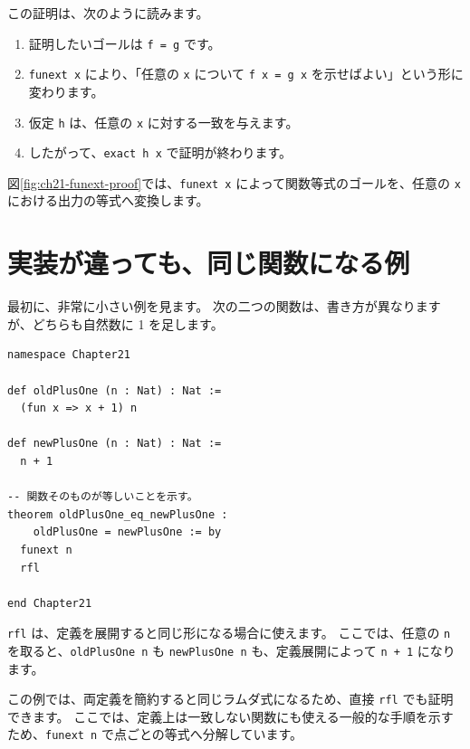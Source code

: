 この証明は、次のように読みます。

\begin{enumerate}
\item 証明したいゴールは \texttt{f = g} です。
\item \texttt{funext x} により、「任意の \texttt{x} について \texttt{f x = g x} を示せばよい」という形に変わります。
\item 仮定 \texttt{h} は、任意の \texttt{x} に対する一致を与えます。
\item したがって、\texttt{exact h x} で証明が終わります。
\end{enumerate}

図\ref{fig:ch21-funext-proof}では、\texttt{funext x} によって関数等式のゴールを、任意の \texttt{x} における出力の等式へ変換します。


\section{実装が違っても、同じ関数になる例}

最初に、非常に小さい例を見ます。
次の二つの関数は、書き方が異なりますが、どちらも自然数に 1 を足します。

\begin{listing}[htbp]
\begin{verbatim}
namespace Chapter21

def oldPlusOne (n : Nat) : Nat :=
  (fun x => x + 1) n

def newPlusOne (n : Nat) : Nat :=
  n + 1

-- 関数そのものが等しいことを示す。
theorem oldPlusOne_eq_newPlusOne :
    oldPlusOne = newPlusOne := by
  funext n
  rfl

end Chapter21
\end{verbatim}
\caption{\texttt{oldPlusOne\_eq\_newPlusOne}}
\label{lst:ch21-old-new-plus-one}
\end{listing}

\texttt{rfl} は、定義を展開すると同じ形になる場合に使えます。
ここでは、任意の \texttt{n} を取ると、\texttt{oldPlusOne n} も \texttt{newPlusOne n} も、定義展開によって \texttt{n + 1} になります。

この例では、両定義を簡約すると同じラムダ式になるため、直接 \texttt{rfl} でも証明できます。
ここでは、定義上は一致しない関数にも使える一般的な手順を示すため、\texttt{funext n} で点ごとの等式へ分解しています。


